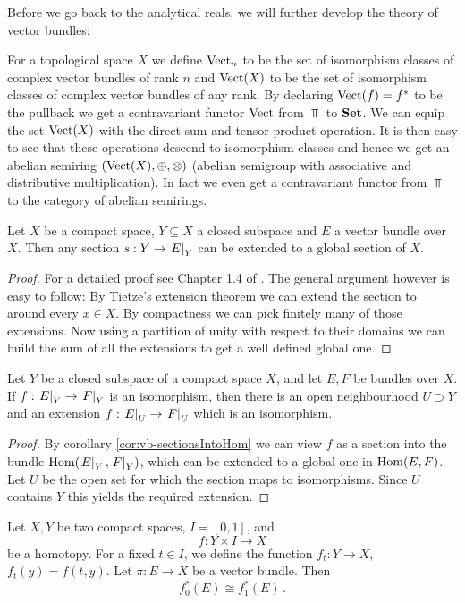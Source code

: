 Before we go back to the analytical reals, we will further develop the theory of vector bundles:
\begin{definition}
	For a topological space $X$ we define $\operatorname{\mathrm{Vect}}_n$ to be the set of isomorphism classes of complex vector bundles of rank $n$ and  $\operatorname{\mathrm{Vect}}(X)$ to be the set of isomorphism classes of complex vector bundles of any rank. By declaring $\operatorname{\mathrm{Vect}}(f)=f^*$ to be the pullback we get a contravariant functor $\operatorname{\mathrm{Vect}}$ from $\Top$ to $\operatorname{\mathbf{Set}}$. We can equip the set $\operatorname{\mathrm{Vect}}(X)$ with the direct sum and tensor product operation. It is then easy to see that these operations descend to isomorphism classes and hence we get an abelian semiring $(\operatorname{\mathrm{Vect}}(X),\oplus,\otimes)$ (abelian semigroup with associative and distributive multiplication). In fact we even get a contravariant functor from $\Top$ to the category of abelian semirings.
\end{definition}
\begin{lemma}\label{lem:kTheo-sectionExtension}
	Let $X$ be a compact space, $Y\subseteq X$ a closed subspace and $E$ a vector bundle over $X$. Then any section $s:Y\to \left.E\right|_{Y}$ can be extended to a global section of $X$.
\end{lemma}
\begin{proof}
	For a detailed proof see Chapter 1.4 of \cite{atiyah1989k}. The general argument however is easy to follow: By Tietze's extension theorem we can extend the section to around every $x\in X$. By compactness we can pick finitely many of those extensions. Now using a partition of unity with respect to their domains we can build the sum of all the extensions to get a well defined global one. 
\end{proof}
\begin{corollary}\label{cor:kTheo-isomorphismExtension}
	Let $Y$ be a closed subspace of a compact space $X$, and let $E,F$ be bundles over $X$. If $f:\left.E\right|_{Y}\to \left.F\right|_{Y}$ is an isomorphism, then there is an open neighbourhood $U\supset Y$ and an extension $f:  \left.E\right|_{U}\to \left.F\right|_{U}$ which is an isomorphism.
\end{corollary}
\begin{proof}
	By corollary \ref{cor:vb-sectionsIntoHom} we can view $f$ as a section into the bundle $\operatorname{\mathrm{Hom}}(\left.E\right|_{Y},\left.F\right|_{Y})$, which can be extended to a global one in $\operatorname{\mathrm{Hom}}(E,F)$. Let $U$ be the open set for which the section maps to isomorphisms. Since $U$ contains $Y$ this yields the required extension.
\end{proof}
\begin{theorem}\label{thm:kTheo-homotopyInvariance}
	Let $X,Y$ be two compact spaces, $I=[0,1]$, and 
	\begin{equation*}
		f: Y\times I\to X
	\end{equation*} be a homotopy. For a fixed $t\in I$, we define the function $f_t:Y\to X$, $f_t(y)=f(t,y)$. Let $\pi: E\to X$ be a vector bundle. Then 
	\begin{equation*}
		f_0^*(E)\cong f_1^*(E)\,.
	\end{equation*}
\end{theorem}
